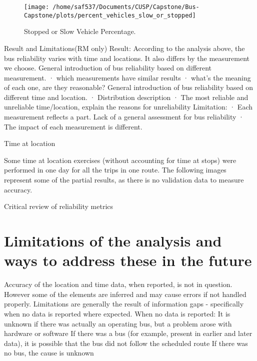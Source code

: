 \documentclass[12pt,journal,compsoc]{IEEEtran}
\begin{document}
\begin{itemize}
\begin{figure}[!ht]
  \caption{Stopped or Slow Vehicle Percentage.}
  \label{stopped_slow}
  \centering
    \texttt{[image: /home/saf537/Documents/CUSP/Capstone/Bus-Capstone/plots/percent\_vehicles\_slow\_or\_stopped]}
\end{figure}




\end{itemize}


 
Result and Limitations(RM only)
Result:
According to the analysis above, the bus reliability varies with time and locations. It also differs by the measurement we choose.
General introduction of bus reliability based on different measurement.
·      which measurements have similar results
·      what’s the meaning of each one, are they reasonable?
General introduction of bus reliability based on different time and location.
·      Distribution description
·      The most reliable and unreliable time/location, explain the reasons for unreliability
Limitation:
·      Each measurement reflects a part. Lack of a general assessment for bus reliability
·      The impact of each measurement is different.


Time at location

Some time at location exercises (without accounting for time at stops) were performed in one day for all the trips in one route. The following images represent some of the partial results, as there is no validation data to measure accuracy.







Critical review of reliability metrics



\section{Limitations of the analysis and ways to address these in the future}
Accuracy of the location and time data, when reported, is not in question. However some of the elements are inferred and may cause errors if not handled properly.
Limitations are generally the result of information gaps - specifically when no data is reported where expected.
When no data is reported:
It is unknown if there was actually an operating bus, but a problem arose with hardware or software
If there was a bus (for example, present in earlier and later data), it is possible that the bus did not follow the scheduled route
If there was no bus, the cause is unknown
\end{document}
